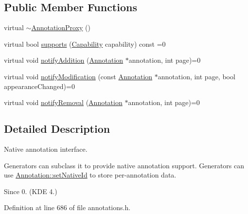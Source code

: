 \subsection*{Public Member Functions}
\begin{DoxyCompactItemize}
\item 
virtual \hyperlink{classOkular_1_1AnnotationProxy_ad24d82a89e740d30a33f3a9a8657304b}{$\sim$\+Annotation\+Proxy} ()
\item 
virtual bool \hyperlink{classOkular_1_1AnnotationProxy_a4672c7ad39b464c0676e277cd9adbac7}{supports} (\hyperlink{classOkular_1_1AnnotationProxy_ae89e16435aa7e10ac4089e673f44e543}{Capability} capability) const =0
\item 
virtual void \hyperlink{classOkular_1_1AnnotationProxy_a6fcdaa71557ad79ff1fbbd924887bdfc}{notify\+Addition} (\hyperlink{classOkular_1_1Annotation}{Annotation} $\ast$annotation, int page)=0
\item 
virtual void \hyperlink{classOkular_1_1AnnotationProxy_acb43272324440c199bd7a450b41c0d34}{notify\+Modification} (const \hyperlink{classOkular_1_1Annotation}{Annotation} $\ast$annotation, int page, bool appearance\+Changed)=0
\item 
virtual void \hyperlink{classOkular_1_1AnnotationProxy_a5d893c0ad68dc29e43e58c7a08f5de49}{notify\+Removal} (\hyperlink{classOkular_1_1Annotation}{Annotation} $\ast$annotation, int page)=0
\end{DoxyCompactItemize}


\subsection{Detailed Description}
Native annotation interface. 

Generators can subclass it to provide native annotation support. Generators can use \hyperlink{classOkular_1_1Annotation_a77c8188ca0d81966c29aebe0ef7ccfef}{Annotation\+::set\+Native\+Id} to store per-\/annotation data.

\begin{DoxySince}{Since}
0. (K\+D\+E 4.) 
\end{DoxySince}


Definition at line 686 of file annotations.\+h.



